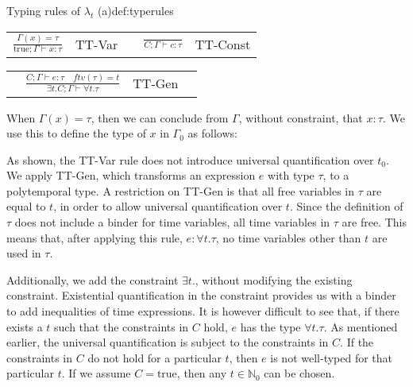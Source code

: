 \begin{definitiontitled}{Typing rules of $\lambda_t$ (a)}{def:typerules}
\begin{tabularx}{\textwidth}{ r r X r r}
\centering
$ \displaystyle 
  \frac{  \Gamma(x) = \tau
  }{      \text{true}; \Gamma \vdash x : \tau }
$ &
TT-Var
&
&
\centering
$ \displaystyle
\frac{ 
} { C; \Gamma \vdash c : \tau }
$ &
TT-Const \\
\end{tabularx}\newline
\begin{tabularx}{\textwidth}{X r l X}
&
$ \displaystyle
  \frac{ C; \Gamma \vdash e : \tau \quad \textit{ftv}(\tau) = t 
  }{     \exists t. C; \Gamma \vdash \forall t.\tau }
$ 
& TT-Gen 
& \\
\end{tabularx}
\end{definitiontitled}

When $\Gamma(x) = \tau$, then we can conclude from $\Gamma$, without constraint, that $x : \tau$.
We use this to define the type of $x$ in $\Gamma_0$ as follows:
\begin{prooftree}
\end{prooftree}

As shown, the TT-Var rule does not introduce universal quantification over $t_0$.
We apply TT-Gen, which transforms an expression $e$ with type $\tau$, to a polytemporal type.
A restriction on TT-Gen is that all free variables in $\tau$ are equal to $t$, in order to allow universal quantification over $t$.
Since the definition of $\tau$ does not include a binder for time variables, all time variables in $\tau$ are free.
This means that, after applying this rule, $e : \forall t.\tau$, no time variables other than $t$ are used in $\tau$.

Additionally, we add the constraint $\exists t.$, without modifying the existing constraint.
Existential quantification in the constraint provides us with a binder to add inequalities of time expressions.
It is however difficult to see that, if there exists a $t$ such that the constraints in $C$ hold, $e$ has the type $\forall t.\tau$.
As mentioned earlier, the universal quantification is subject to the constraints in $C$.
If the constraints in $C$ do not hold for a particular $t$, then $e$ is not well-typed for that particular $t$.
If we assume $C = \text{true}$, then any $t \in \mathbb{N}_0$ can be chosen. 

